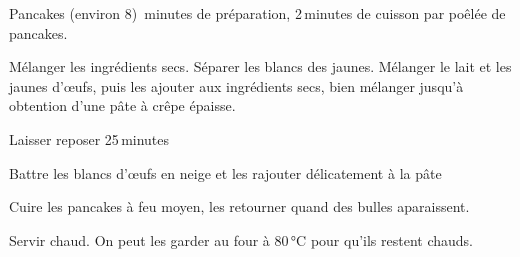 \documentclass[12pt]{article}
\begin{document}
\begin{recipe}{Pancakes (environ 8)}
\,minutes de préparation, 2\,minutes de cuisson par poêlée de pancakes.
\ingredient{}

 Mélanger les ingrédients secs.
 Séparer les blancs des jaunes.
 Mélanger le lait et les jaunes d’œufs, puis les ajouter aux ingrédients secs, bien mélanger jusqu’à obtention d’une pâte à crêpe épaisse.

Laisser reposer 25\,minutes

Battre les blancs d’œufs en neige et les rajouter délicatement à la pâte

Cuire les pancakes à feu moyen, les retourner quand des bulles aparaissent.

Servir chaud. On peut les garder au four à 80\,°C pour qu’ils restent chauds.
\end{recipe}
\end{document}
